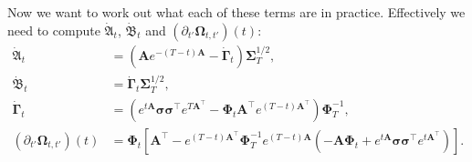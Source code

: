 \documentclass{article}
\newcommand{\bmathfrak}[1]{\bm{\mathfrak{#1}}}
\theoremstyle{newstyle}
\begin{document}
Now we want to work out what each of these terms are in practice. Effectively we need to compute $\dot{\bmathfrak{A}}_t$, $\dot{\bmathfrak{B}}_t$ and $(\partial_{t'} \bm{\Omega}_{t, t'})(t)$:
\begin{align}
  \dot{\bmathfrak{A}}_t &= (\bm{A} e^{-(T-t) \bm{A}} - \dot{\bm{\Gamma}}_t) \bm{\Sigma}_T^{1/2}, \\
  \dot{\bmathfrak{B}}_t &= \dot{\bm{\Gamma}}_t \bm{\Sigma}_T^{1/2}, \\
  \dot{\bm{\Gamma}}_t &= \left( e^{t\bm{A}} \bm{\sigma} \bm{\sigma}^\top e^{T\bm{A}^\top} - \bm{\Phi}_t \bm{A}^\top e^{(T-t) \bm{A}^\top} \right) \bm{\Phi}_T^{-1} , \\
  (\partial_{t'} \bm{\Omega}_{t, t'})(t) &= \bm{\Phi}_t \left[ \bm{A}^\top - e^{(T-t) \bm{A}^\top} \bm{\Phi}_T^{-1} e^{(T-t)\bm{A}} \left( -\bm{A} \bm{\Phi}_t + e^{t\bm{A}} \bm{\sigma}\bm{\sigma}^\top e^{t\bm{A}^\top} \right) \right]. 
\end{align}
\end{document}
